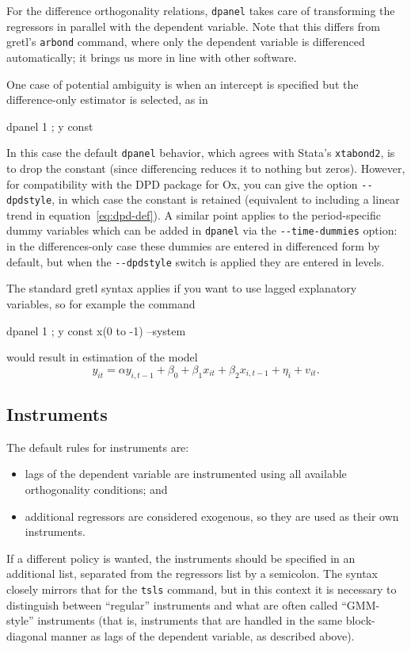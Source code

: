 For the difference orthogonality relations, \texttt{dpanel} takes care
of transforming the regressors in parallel with the dependent
variable. Note that this differs from gretl's \texttt{arbond} command,
where only the dependent variable is differenced automatically; it
brings us more in line with other software.

One case of potential ambiguity is when an intercept is specified but
the difference-only estimator is selected, as in
\begin{code}
  dpanel 1 ; y const
\end{code}
In this case the default \texttt{dpanel} behavior, which agrees with
Stata's \texttt{xtabond2}, is to drop the constant (since differencing
reduces it to nothing but zeros). However, for compatibility with the
DPD package for Ox, you can give the option \verb|--dpdstyle|, in
which case the constant is retained (equivalent to including a linear
trend in equation~\ref{eq:dpd-def}).  A similar point applies to the
period-specific dummy variables which can be added in \texttt{dpanel}
via the \verb|--time-dummies| option: in the differences-only case
these dummies are entered in differenced form by default, but when the
\verb|--dpdstyle| switch is applied they are entered in levels.

The standard gretl syntax applies if you want to use lagged
explanatory variables, so for example the command
\begin{code}
  dpanel 1 ; y const x(0 to -1) --system
\end{code}
would result in estimation of the model
\[
  y_{it} = \alpha y_{i,t-1} + 
  \beta_0 + \beta_1 x_{it} + \beta_2 x_{i,t-1} +
  \eta_{i} + v_{it} .
\]


\subsection{Instruments}

The default rules for instruments are: 
\begin{itemize}
\item lags of the dependent variable are instrumented using all
  available orthogonality conditions; and
\item additional regressors are considered exogenous, so they are used
  as their own instruments.
\end{itemize}

If a different policy is wanted, the instruments should be specified
in an additional list, separated from the regressors list by a
semicolon. The syntax closely mirrors that for the \texttt{tsls}
command, but in this context it is necessary to distinguish between
``regular'' instruments and what are often called ``GMM-style''
instruments (that is, instruments that are handled in the same
block-diagonal manner as lags of the dependent variable, as described
above).

